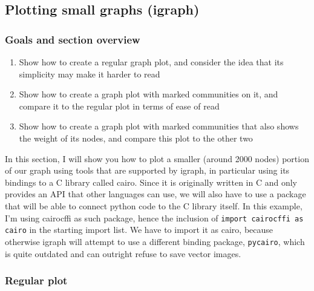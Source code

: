 \documentclass[12pt, a4paper]{article}
\begin{document}
\newpage
\subsection{Plotting small graphs (igraph)}
\subsubsection{Goals and section overview}

\begin{enumerate}
  \item Show how to create a regular graph plot, and consider the idea that its simplicity may make it harder to read
  \item Show how to create a graph plot with marked communities on it, and compare it to the regular plot in terms of ease of read
  \item Show how to create a graph plot with marked communities that also shows the weight of its nodes, and compare this plot to the other two
\end{enumerate}


In this section, I will show you how to plot a smaller (around 2000 nodes) portion of our graph using tools that are supported by igraph, in particular using its bindings to a C library called  cairo. Since it is originally written in C and only provides an API that other languages can use, we will also have to use a package that will be able to connect python code to the C library itself. In this example, I'm using cairocffi as such package, hence the inclusion of \texttt{import cairocffi as cairo} in the starting import list. We have to import it as cairo, because otherwise igraph will attempt to use a different binding package, \texttt{pycairo}, which is quite outdated and can outright refuse to save vector images.

\subsubsection{Regular plot}
\end{document}
